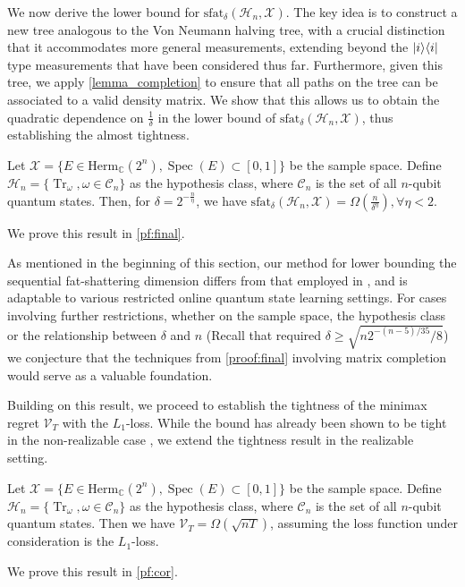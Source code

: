 We now derive the lower bound for $\text{sfat}_\delta (\mathcal{H}_n, \mathcal{X})$. The key idea is to construct a new tree analogous to the Von Neumann halving tree, with a crucial distinction that it accommodates more general measurements, extending beyond the $| i \rangle \langle i |$ type measurements that have been considered thus far. Furthermore, given this tree, we apply \cref{lemma_completion} to ensure that all paths on the tree can be associated to a valid density matrix. We show that this allows us to obtain the quadratic dependence on $\frac{1}{\delta}$ in the lower bound of $\text{sfat}_\delta (\mathcal{H}_n, \mathcal{X})$, thus establishing the almost tightness.
\begin{theorem}\label{thm:final}
    Let $\mathcal{X} = \{E\in\mathrm{Herm}_{\mathbb{C}}(2^n), \operatorname{Spec}(E)\subset[0,1]\}$ be the sample space.
    Define $\mathcal{H}_n=\{\operatorname{Tr}_\omega, \omega\in\mathcal C_n\}$ as the hypothesis class, where $\mathcal{C}_n$ is the set of all $n$-qubit quantum states. Then, for $\delta=2^{-\frac n\eta}$, we have $\text{sfat}_\delta(\mathcal H_n, \mathcal{X})=\Omega(\frac n{\delta^\eta}), \forall\eta < 2$.
\end{theorem}
We prove this result in \cref{pf:final}.
\begin{remark}

    As mentioned in the beginning of this section, our method for lower bounding the sequential fat-shattering dimension differs from that employed in \citet{aaronson2007learnability}, and is adaptable to various restricted online quantum state learning settings. For cases involving further restrictions, whether on the sample space, the hypothesis class or the relationship between $\delta$ and $n$ (Recall that \citet{aaronson2007learnability} required $\delta\geq\sqrt{n2^{-(n-5)/35}/8}$) we conjecture that the techniques from \cref{proof:final} involving matrix completion would serve as a valuable foundation. 


\end{remark}

Building on this result, we proceed to establish the tightness of the minimax regret $\mathcal{V}_T$ with the $L_1$-loss. While the bound has already been shown to be tight in the non-realizable case \citep{arora2012multiplicative, aaronson2019online}, we extend the tightness result in the realizable setting.



\begin{corollary}
\label{cor:tight_reg_gen}
    Let $\mathcal{X} = \{E\in\mathrm{Herm}_{\mathbb{C}}(2^n), \operatorname{Spec}(E)\subset[0,1]\}$ be the sample space.
    Define $\mathcal{H}_n=\{\operatorname{Tr}_\omega, \omega\in\mathcal C_n\}$ as the hypothesis class, where $\mathcal{C}_n$ is the set of all $n$-qubit quantum states. Then we have $\mathcal{V}_T=\Omega(\sqrt{nT})$, assuming the loss function under consideration is the $L_1$-loss.
\end{corollary}
We prove this result in \cref{pf:cor}.
